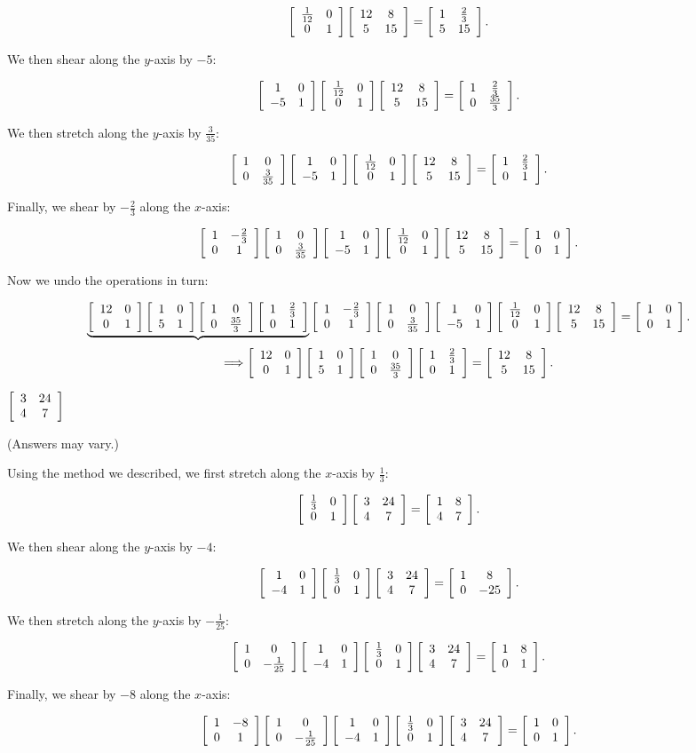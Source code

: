 \documentclass[../key.tex]{subfiles}
\begin{document}
$$\twomat{\frac{1}{12}}{0}{0}{1}\twomat{12}{8}{5}{15} = \twomat{1}{\frac{2}{3}}{5}{15}.$$

We then shear along the $y$-axis by $-5$:

$$\twomat{1}{0}{-5}{1}\twomat{\frac{1}{12}}{0}{0}{1}\twomat{12}{8}{5}{15} = \twomat{1}{\frac{2}{3}}{0}{\frac{35}{3}}.$$

We then stretch along the $y$-axis by $\frac{3}{35}$:

$$\twomat{1}{0}{0}{\frac{3}{35}}\twomat{1}{0}{-5}{1}\twomat{\frac{1}{12}}{0}{0}{1}\twomat{12}{8}{5}{15} = \twomat{1}{\frac{2}{3}}{0}{1}.$$

Finally, we shear by $-\frac{2}{3}$ along the $x$-axis:

$$\twomat{1}{-\frac{2}{3}}{0}{1}\twomat{1}{0}{0}{\frac{3}{35}}\twomat{1}{0}{-5}{1}\twomat{\frac{1}{12}}{0}{0}{1}\twomat{12}{8}{5}{15} = \twomat{1}{0}{0}{1}.$$

Now we undo the operations in turn:

$$\underbrace{\twomat{12}{0}{0}{1}\twomat{1}{0}{5}{1}\twomat{1}{0}{0}{\frac{35}{3}}\twomat{1}{\frac{2}{3}}{0}{1}}\twomat{1}{-\frac{2}{3}}{0}{1}\twomat{1}{0}{0}{\frac{3}{35}}\twomat{1}{0}{-5}{1}\twomat{\frac{1}{12}}{0}{0}{1}\twomat{12}{8}{5}{15} = \twomat{1}{0}{0}{1}.$$
$$\Longrightarrow \twomat{12}{0}{0}{1}\twomat{1}{0}{5}{1}\twomat{1}{0}{0}{\frac{35}{3}}\twomat{1}{\frac{2}{3}}{0}{1} = \twomat{12}{8}{5}{15}.$$

\begin{inner_problem}
\item $\twomat{3}{24}{4}{7}$
\end{inner_problem}

(Answers may vary.)

Using the method we described, we first stretch along the $x$-axis by $\frac{1}{3}$:

$$\twomat{\frac{1}{3}}{0}{0}{1}\twomat{3}{24}{4}{7} = \twomat{1}{8}{4}{7}.$$

We then shear along the $y$-axis by $-4$:

$$\twomat{1}{0}{-4}{1}\twomat{\frac{1}{3}}{0}{0}{1}\twomat{3}{24}{4}{7} = \twomat{1}{8}{0}{-25}.$$

We then stretch along the $y$-axis by $-\frac{1}{25}$:

$$\twomat{1}{0}{0}{-\frac{1}{25}}\twomat{1}{0}{-4}{1}\twomat{\frac{1}{3}}{0}{0}{1}\twomat{3}{24}{4}{7} = \twomat{1}{8}{0}{1}.$$

Finally, we shear by $-8$ along the $x$-axis:

$$\twomat{1}{-8}{0}{1}\twomat{1}{0}{0}{-\frac{1}{25}}\twomat{1}{0}{-4}{1}\twomat{\frac{1}{3}}{0}{0}{1}\twomat{3}{24}{4}{7} = \twomat{1}{0}{0}{1}.$$
\end{document}
